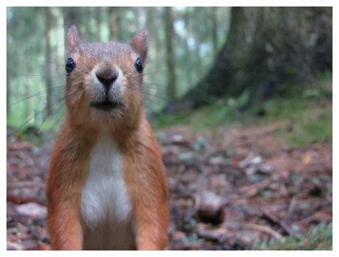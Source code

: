 \documentclass[xcolor=svgnames]{beamer}
\begin{document}
    \begin{frame}
        \begin{center}
            \includegraphics[width=0.8\textwidth]{img/questions}
        \end{center}
    \end{frame}
\end{document}
